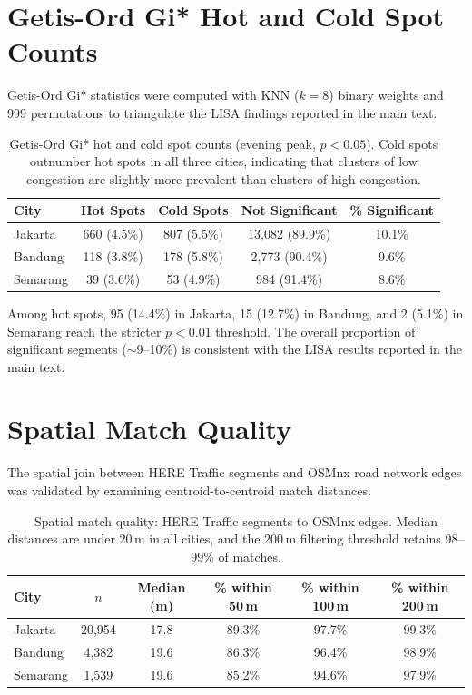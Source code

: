 \documentclass[preprint,12pt]{elsarticle}
\begin{document}
\section{Getis-Ord Gi* Hot and Cold Spot Counts}
\label{sec:s3}

Getis-Ord Gi* statistics were computed with KNN ($k{=}8$) binary weights and 999 permutations to triangulate the LISA findings reported in the main text.

\begin{table}[!htbp]
\centering
\caption{Getis-Ord Gi* hot and cold spot counts (evening peak, $p < 0.05$). Cold spots outnumber hot spots in all three cities, indicating that clusters of low congestion are slightly more prevalent than clusters of high congestion.}
\label{tab:s3}
\begin{tabular}{lcccc}
\toprule
City & Hot Spots & Cold Spots & Not Significant & \% Significant \\
\midrule
Jakarta  & 660 (4.5\%) & 807 (5.5\%) & 13,082 (89.9\%) & 10.1\% \\
Bandung  & 118 (3.8\%) & 178 (5.8\%) & 2,773 (90.4\%)  & 9.6\%  \\
Semarang & 39 (3.6\%)  & 53 (4.9\%)  & 984 (91.4\%)    & 8.6\%  \\
\bottomrule
\end{tabular}
\end{table}

Among hot spots, 95 (14.4\%) in Jakarta, 15 (12.7\%) in Bandung, and 2 (5.1\%) in Semarang reach the stricter $p < 0.01$ threshold. The overall proportion of significant segments ($\sim$9--10\%) is consistent with the LISA results reported in the main text.

\section{Spatial Match Quality}
\label{sec:s4}

The spatial join between HERE Traffic segments and OSMnx road network edges was validated by examining centroid-to-centroid match distances.

\begin{table}[!htbp]
\centering
\caption{Spatial match quality: HERE Traffic segments to OSMnx edges. Median distances are under 20\,m in all cities, and the 200\,m filtering threshold retains 98--99\% of matches.}
\label{tab:s4}
\begin{tabular}{lccccc}
\toprule
City & $n$ & Median (m) & \% within 50\,m & \% within 100\,m & \% within 200\,m \\
\midrule
Jakarta  & 20,954 & 17.8 & 89.3\% & 97.7\% & 99.3\% \\
Bandung  & 4,382  & 19.6 & 86.3\% & 96.4\% & 98.9\% \\
Semarang & 1,539  & 19.6 & 85.2\% & 94.6\% & 97.9\% \\
\bottomrule
\end{tabular}
\end{table}
\end{document}
